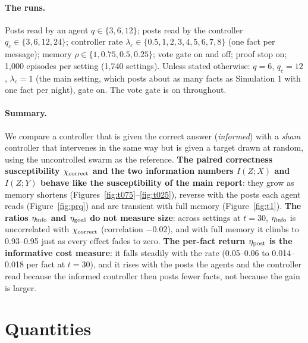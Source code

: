 \documentclass[10pt,a4paper]{article}
\begin{document}
\paragraph{The runs.} Posts read by an agent $q \in \{3, 6, 12\}$; posts read by the controller
$q_c \in \{3, 6, 12, 24\}$; controller rate $\lambda_c \in \{0.5, 1, 2, 3, 4, 5, 6, 7, 8\}$ (one fact per
message); memory $\rho \in \{1, 0.75, 0.5, 0.25\}$; vote gate on and off; proof stop on; 1{,}000 episodes per
setting (1{,}740 settings). Unless stated otherwise: $q = 6$, $q_c = 12$, $\lambda_c = 1$ (the main setting,
which posts about as many facts as Simulation 1 with one fact per night), gate on. The vote gate is on throughout.


\paragraph{Summary.} We compare a controller that is given the correct answer (\emph{informed}) with a \emph{sham}
controller that intervenes in the same way but is given a target drawn at random, using the uncontrolled swarm as
the reference. \textbf{The paired correctness susceptibility $\chi_{\rm correct}$ and the two information numbers
$I(Z;X)$ and $I(Z;Y)$ behave like the susceptibility of the main report}: they grow as memory shortens
(Figures~\ref{fig:t075}--\ref{fig:t025}), reverse with the posts each agent reads (Figure~\ref{fig:prq}) and are
transient with full memory (Figure~\ref{fig:t1}). \textbf{The ratios $\eta_{\rm info}$ and $\eta_{\rm goal}$ do not
measure size}: across settings at $t = 30$, $\eta_{\rm info}$ is uncorrelated with $\chi_{\rm correct}$ (correlation
$-0.02$), and with full memory it climbs to 0.93--0.95 just as every effect fades to zero. \textbf{The per-fact return
$\eta_{\rm post}$ is the informative cost measure}: it falls steadily with the rate (0.05--0.06 to 0.014--0.018 per fact at
$t = 30$), and it rises with the posts the agents and the controller read because the informed controller then posts
fewer facts, not because the gain is larger.

\section{Quantities}\label{sec:quantities}
\end{document}
